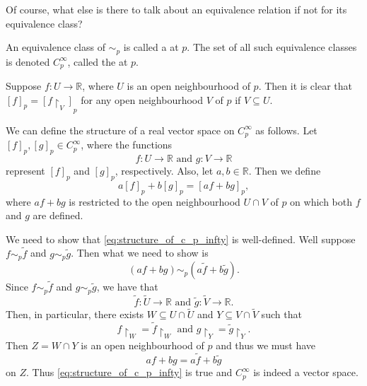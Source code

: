 \documentclass[notoc,notitlepage]{tufte-book}
\begin{document}
Of course, what else is there to talk about an equivalence relation if not for its
equivalence class?

\begin{defn}\label{defn:germ_of_functions}
  An equivalence class of $\sim_p$ is called a  at $p$.
  The set of all such equivalence classes is denoted $C_p^{\infty}$, called the
   at $p$.
\end{defn}

\begin{note}
  Suppose $f : U \to \mathbb{R}$, where $U$ is an open neighbourhood of $p$. Then it
  is clear that $[f]_p = [f \restriction_V]_p$ for any open neighbourhood $V$ of $p$
  if $V \subseteq U$.
\end{note}

We can define the structure of a real vector space on $C_p^{\infty}$ as follows. Let
$[f]_p, [g]_p \in C_p^{\infty}$, where the functions
\begin{equation*}
  f : U \to \mathbb{R} \text{ and } g : V \to \mathbb{R}
\end{equation*}
represent $[f]_p$ and $[g]_p$, respectively. Also, let $a, b \in \mathbb{R}$. Then we
define
\begin{equation}\label{eq:structure_of_c_p_infty}
  a[f]_p + b[g]_p = [af + bg]_p,
\end{equation}
where $af + bg$ is restricted to the open neighbourhood $U \cap V$ of $p$ on which
both $f$ and $g$ are defined.

We need to show that \cref{eq:structure_of_c_p_infty} is well-defined. Well suppose
$f \sim_p \tilde{f}$ and $g \sim_p \tilde{g}$. Then what we need to show is
\begin{equation*}
  (af + bg) \sim_p (a\tilde{f} + b\tilde{g}).
\end{equation*}
Since $f \sim_p \tilde{f}$ and $g \sim_p \tilde{g}$, we have that
\begin{equation*}
  \tilde{f} : \tilde{U} \to \mathbb{R} \text{ and } \tilde{g} : \tilde{V} \to \mathbb{R}.
\end{equation*}
Then, in particular, there exists $W \subseteq U \cap \tilde{U}$ and $Y \subseteq V
\cap \tilde{V}$ such that
\begin{equation*}
  f \restriction_W = \tilde{f} \restriction_W \text{ and }
  g \restriction_Y = \tilde{g} \restriction_Y.
\end{equation*}
Then $Z = W \cap Y$ is an open neighbourhood of $p$ and thus we must have
\begin{equation*}
  af + bg = a\tilde{f} + b \tilde{g}
\end{equation*}
on $Z$. Thus \cref{eq:structure_of_c_p_infty} is true and $C_p^{\infty}$ is indeed
a vector space.
\end{document}
